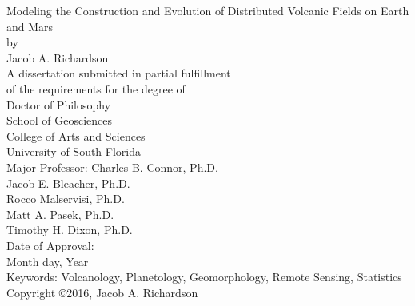 \begin{titlepage}
\begin{center}
\singlespacing
{ \vspace*{\baselineskip} }
{ \vspace*{\baselineskip} }
{ \vspace*{\baselineskip} }
{ \vspace*{\baselineskip} }
Modeling the Construction and Evolution of Distributed Volcanic Fields on Earth and Mars\\
{ \vspace*{\baselineskip} }
{ \vspace*{\baselineskip} }
{ \vspace*{\baselineskip} }
by\\
{ \vspace*{\baselineskip} }
{ \vspace*{\baselineskip} }
{ \vspace*{\baselineskip} }
Jacob A. Richardson\\
{ \vspace*{\baselineskip} }
{ \vspace*{\baselineskip} }
{ \vspace*{\baselineskip} }
{ \vspace*{\baselineskip} }
A dissertation submitted in partial fulfillment\\
of the requirements for the degree of\\
Doctor of Philosophy\\
School of Geosciences\\
College of Arts and Sciences\\
University of South Florida\\
{ \vspace*{\baselineskip} }
{ \vspace*{\baselineskip} }
{ \vspace*{\baselineskip} }
Major Professor: Charles B. Connor, Ph.D.\\
Jacob E. Bleacher, Ph.D.\\
Rocco Malservisi, Ph.D.\\
Matt A. Pasek, Ph.D.\\
Timothy H. Dixon, Ph.D.\\
{ \vspace*{\baselineskip} }
{ \vspace*{\baselineskip} }
Date of Approval:\\
Month day, Year\\
{ \vspace*{\baselineskip} }
{ \vspace*{\baselineskip} }
{ \vspace*{\baselineskip} }
Keywords: Volcanology, Planetology, Geomorphology, Remote Sensing, Statistics\\
{ \vspace*{\baselineskip} }
Copyright \copyright\hspace{1mm}2016, Jacob A. Richardson\\
\end{center}
\end{titlepage}
